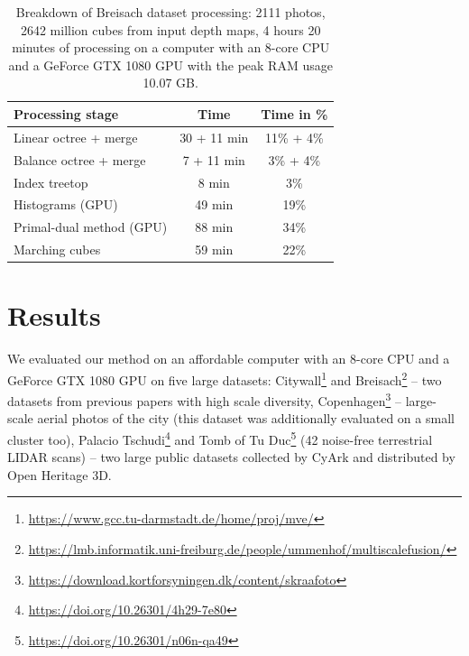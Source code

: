 \documentclass[10pt,twocolumn,letterpaper]{article}
\begin{document}
\begin{table}

    \caption{
        Breakdown of Breisach dataset processing:
        2111 photos, 2642 million cubes from input depth maps, 4 hours 20 minutes of processing on a computer with an 8-core CPU and a GeForce GTX 1080 GPU with the peak RAM usage 10.07 GB.
    }

    \begin{tabular}{  |l||c|c| }
        \hline
        \textbf{Processing stage} & \textbf{Time} & \textbf{Time in \%} \\
        \hline
        Linear octree + merge & 30 + 11 min & 11\% + 4\% \\
        \hline
        Balance octree + merge & 7 + 11 min & 3\% + 4\% \\
        \hline
        Index treetop & 8 min & 3\%\\
        \hline
        Histograms (GPU) & 49 min & 19\%\\
        \hline
        Primal-dual method (GPU) & 88 min & 34\% \\
        \hline
        Marching cubes & 59 min & 22\% \\
        \hline
    \end{tabular}

    \label{tab:breisach_breakdown}

\end{table}

\section{Results}

We evaluated our method on an affordable computer with an 8-core CPU and a GeForce GTX 1080 GPU on five large datasets: Citywall\footnote{\url{https://www.gcc.tu-darmstadt.de/home/proj/mve/}} \cite{fuhrmann2014mve}
and Breisach\footnote{\url{https://lmb.informatik.uni-freiburg.de/people/ummenhof/multiscalefusion/}} \cite{ummenhofer2015global}
-- two datasets from previous papers with high scale diversity, Copenhagen\footnote{\url{https://download.kortforsyningen.dk/content/skraafoto}} \cite{skraafoto_copenhagen}
-- large-scale aerial photos of the city (this dataset was additionally evaluated on a small cluster too),
Palacio Tschudi\footnote{\url{https://doi.org/10.26301/4h29-7e80}} \cite{palacio_tschudi}
and Tomb of Tu Duc\footnote{\url{https://doi.org/10.26301/n06n-qa49}} \cite{tomb_of_tu_duc} (42 noise-free terrestrial LIDAR scans) -- two large public datasets collected by CyArk and distributed by Open Heritage 3D.
\end{document}
